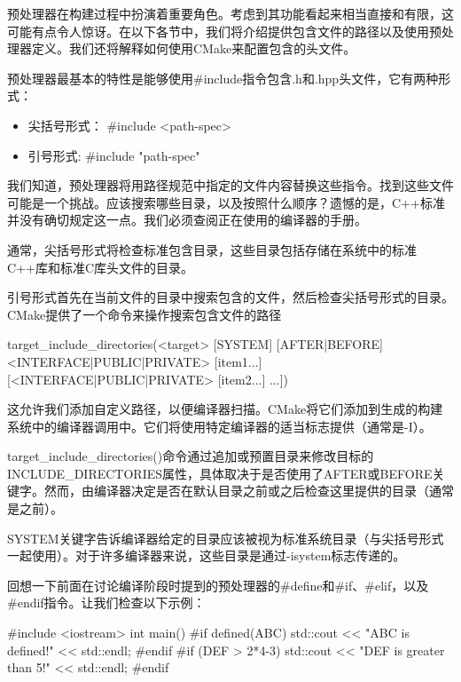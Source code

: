 
预处理器在构建过程中扮演着重要角色。考虑到其功能看起来相当直接和有限，这可能有点令人惊讶。在以下各节中，我们将介绍提供包含文件的路径以及使用预处理器定义。我们还将解释如何使用CMake来配置包含的头文件。


预处理器最基本的特性是能够使用\#include指令包含.h和.hpp头文件，它有两种形式：

\begin{itemize}
\item
尖括号形式： \#include <path-spec>

\item
引号形式: \#include "path-spec"
\end{itemize}

我们知道，预处理器将用路径规范中指定的文件内容替换这些指令。找到这些文件可能是一个挑战。应该搜索哪些目录，以及按照什么顺序？遗憾的是，C++标准并没有确切规定这一点。我们必须查阅正在使用的编译器的手册。

通常，尖括号形式将检查标准包含目录，这些目录包括存储在系统中的标准C++库和标准C库头文件的目录。

引号形式首先在当前文件的目录中搜索包含的文件，然后检查尖括号形式的目录。
CMake提供了一个命令来操作搜索包含文件的路径

\begin{shell}
target_include_directories(<target> [SYSTEM] [AFTER|BEFORE]
                           <INTERFACE|PUBLIC|PRIVATE> [item1...]
                          [<INTERFACE|PUBLIC|PRIVATE> [item2...]
...])
\end{shell}

这允许我们添加自定义路径，以便编译器扫描。CMake将它们添加到生成的构建系统中的编译器调用中。它们将使用特定编译器的适当标志提供（通常是-I）。

target\_include\_directories()命令通过追加或预置目录来修改目标的INCLUDE\_DIRECTORIES属性，具体取决于是否使用了AFTER或BEFORE关键字。然而，由编译器决定是否在默认目录之前或之后检查这里提供的目录（通常是之前）。

SYSTEM关键字告诉编译器给定的目录应该被视为标准系统目录（与尖括号形式一起使用）。对于许多编译器来说，这些目录是通过-isystem标志传递的。


回想一下前面在讨论编译阶段时提到的预处理器的\#define和\#if、\#elif，以及\#endif指令。让我们检查以下示例：


\begin{cpp}
#include <iostream>
int main() {
#if defined(ABC)
    std::cout << "ABC is defined!" << std::endl;
#endif
#if (DEF > 2*4-3)
    std::cout << "DEF is greater than 5!" << std::endl;
#endif
}
\end{cpp}

